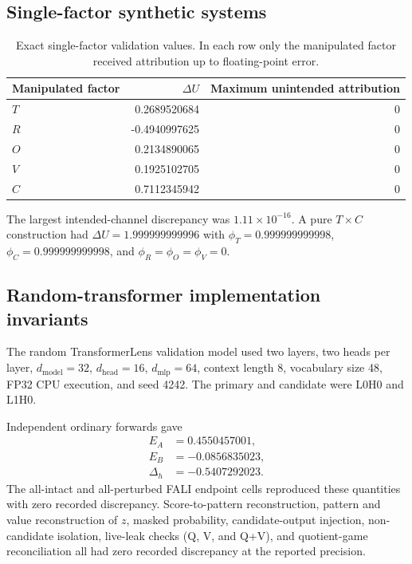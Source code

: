 \documentclass[pdflatex,sn-apa]{sn-jnl}
\begin{document}
\subsection{Single-factor synthetic systems}

\begin{table}[h]
\centering
\caption{Exact single-factor validation values. In each row only the manipulated
factor received attribution up to floating-point error.}
\begin{tabular}{lrr}
\toprule
Manipulated factor & $\Delta U$ & Maximum unintended attribution \\
\midrule
$T$ & 0.2689520684 & 0 \\
$R$ & -0.4940997625 & 0 \\
$O$ & 0.2134890065 & 0 \\
$V$ & 0.1925102705 & 0 \\
$C$ & 0.7112345942 & 0 \\
\bottomrule
\end{tabular}
\end{table}

The largest intended-channel discrepancy was
$1.11\times 10^{-16}$. A pure $T\times C$ construction had
$\Delta U=1.999999999996$ with
$\phi_T=0.999999999998$,
$\phi_C=0.999999999998$, and
$\phi_R=\phi_O=\phi_V=0$.

\subsection{Random-transformer implementation invariants}

The random TransformerLens validation model used two layers, two heads per layer,
$d_{\mathrm{model}}=32$, $d_{\mathrm{head}}=16$, $d_{\mathrm{mlp}}=64$,
context length 8, vocabulary size 48, FP32 CPU execution, and seed 4242.
The primary and candidate were L0H0 and L1H0.

Independent ordinary forwards gave
\begin{align*}
E_A&=0.4550457001,\\
E_B&=-0.0856835023,\\
\Delta_h&=-0.5407292023.
\end{align*}
The all-intact and all-perturbed FALI endpoint cells reproduced these quantities
with zero recorded discrepancy. Score-to-pattern reconstruction, pattern and
value reconstruction of $z$, masked probability, candidate-output injection,
non-candidate isolation, live-leak checks (Q, V, and Q+V), and quotient-game
reconciliation all had zero recorded discrepancy at the reported precision.
\end{document}
